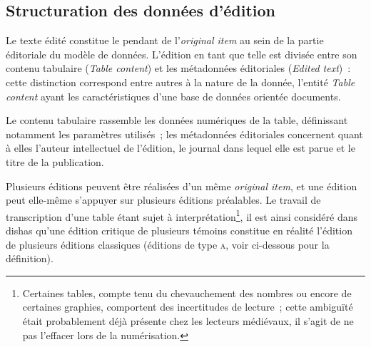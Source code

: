 \documentclass[a4paper,12pt,twoside]{book}
\newcommand{\eng}{\emph}
\newcommand{\oi}{\eng{original item}\xspace}
\newcommand{\dishas}{\gls{dishas}\xspace}
\begin{document}
		\subsection{Structuration des données d'édition}
Le texte édité constitue le pendant de l'\oi au sein de la partie éditoriale du modèle de données. L'édition en tant que telle est divisée entre son contenu tabulaire (\eng{Table content}) et les métadonnées éditoriales (\eng{Edited text})~: cette distinction correspond entre autres à la nature de la donnée, l'entité \eng{Table content} ayant les caractéristiques d'une base de données orientée documents.

Le contenu tabulaire rassemble les données numériques de la table, définissant notamment les paramètres utilisés~; les métadonnées éditoriales concernent quant à elles l'auteur intellectuel de l'édition, le journal dans lequel elle est parue et le titre de la publication.

Plusieurs éditions peuvent être réalisées d'un même \oi, et une édition peut elle-même s'appuyer sur plusieurs éditions préalables. Le travail de transcription d'une table étant sujet à interprétation\footnote{Certaines tables, compte tenu du chevauchement des nombres ou encore de certaines graphies, comportent des incertitudes de lecture~; cette ambiguïté était probablement déjà présente chez les lecteurs médiévaux, il s'agit de ne pas l'effacer lors de la numérisation.}, il est ainsi considéré dans \dishas qu'une édition critique de plusieurs témoins constitue en réalité l'édition de plusieurs éditions classiques (éditions de type \textsc{a}, voir ci-dessous pour la définition).
\end{document}
